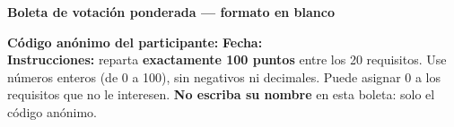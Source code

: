 \documentclass[11pt,a4paper]{article}
\begin{document}
\begin{center}{\large\bfseries Boleta de votación ponderada --- formato en blanco}\end{center}

\noindent\textbf{Código anónimo del participante:} \underline{\hspace{3cm}}
\hfill \textbf{Fecha:} \underline{\hspace{3cm}}\\[4pt]

\noindent\textbf{Instrucciones:} reparta \textbf{exactamente 100 puntos} entre los 20 requisitos. Use números enteros (de 0 a 100), sin negativos ni decimales. Puede asignar 0 a los requisitos que no le interesen. \textbf{No escriba su nombre} en esta boleta: solo el código anónimo.

\vspace{5pt}
\end{document}
